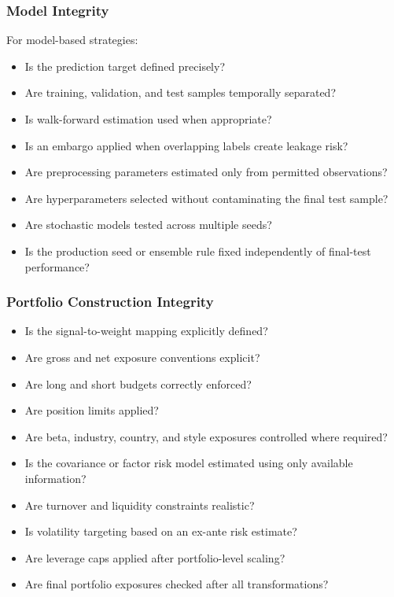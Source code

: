 \documentclass[11pt,a4paper]{article}
\begin{document}
\subsubsection{Model Integrity}

For model-based strategies:

\begin{itemize}
    \item[$\square$] Is the prediction target defined precisely?
    \item[$\square$] Are training, validation, and test samples temporally
    separated?
    \item[$\square$] Is walk-forward estimation used when appropriate?
    \item[$\square$] Is an embargo applied when overlapping labels create
    leakage risk?
    \item[$\square$] Are preprocessing parameters estimated only from permitted
    observations?
    \item[$\square$] Are hyperparameters selected without contaminating the
    final test sample?
    \item[$\square$] Are stochastic models tested across multiple seeds?
    \item[$\square$] Is the production seed or ensemble rule fixed independently
    of final-test performance?
\end{itemize}


\subsubsection{Portfolio Construction Integrity}

\begin{itemize}
    \item[$\square$] Is the signal-to-weight mapping explicitly defined?
    \item[$\square$] Are gross and net exposure conventions explicit?
    \item[$\square$] Are long and short budgets correctly enforced?
    \item[$\square$] Are position limits applied?
    \item[$\square$] Are beta, industry, country, and style exposures controlled
    where required?
    \item[$\square$] Is the covariance or factor risk model estimated using only
    available information?
    \item[$\square$] Are turnover and liquidity constraints realistic?
    \item[$\square$] Is volatility targeting based on an ex-ante risk estimate?
    \item[$\square$] Are leverage caps applied after portfolio-level scaling?
    \item[$\square$] Are final portfolio exposures checked after all
    transformations?
\end{itemize}
\end{document}
